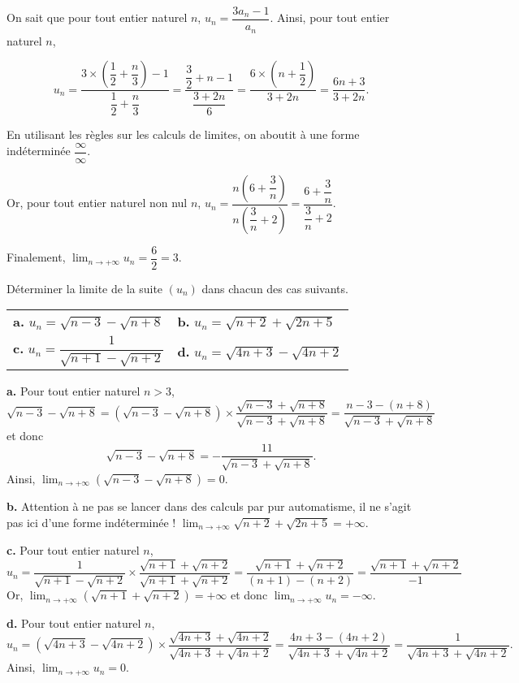 \documentclass[11pt,fleqn]{book} %
\begin{document}
\begin{solution}
On sait que pour tout entier naturel $n$, $u_n=\dfrac{3a_n-1}{a_n}$. Ainsi, pour tout entier naturel $n$,

\[u_n =\dfrac{3 \times \left(\dfrac{1}{2}+\dfrac{n}{3}\right)-1}{\dfrac{1}{2}+\dfrac{n}{3}} =\dfrac{\dfrac{3}{2}+n-1}{\dfrac{3+2n}{6}}=\dfrac{6\times\left(n+\dfrac{1}{2}\right)}{3+2n}=\dfrac{6n+3}{3+2n}.\]

En utilisant les règles sur les calculs de limites, on aboutit à une forme indéterminée $\dfrac{\infty}{\infty}  $. 

Or, pour tout entier naturel non nul $n$, $u_n=\dfrac{n\left(6+\dfrac{3}{n}\right)}{n\left(\dfrac{3}{n}+2\right)}=\dfrac{6+\dfrac{3}{n}}{\dfrac{3}{n}+2}$.

Finalement, $\displaystyle \lim_{n\to+\infty}u_n=\dfrac{6}{2}=3$.\end{solution}



\begin{exercise}[topic=lim03] Déterminer la limite de la suite $(u_n)$ dans chacun des cas suivants.
\begin{center}
\begin{tabularx}{\linewidth}{XX}
\textbf{a.} $ u_n = \sqrt{n-3}-\sqrt{n+8}$ & \textbf{b.} $ u_n=\sqrt{n+2}+\sqrt{2n+5}$ \\
\textbf{c.} $u_n=\dfrac{1}{\sqrt{n+1}-\sqrt{n+2}}$ & \textbf{d.} $u_n=\sqrt{4n+3}-\sqrt{4n+2}$
\end{tabularx}
\end{center}\end{exercise}
\begin{solution}\textbf{a.} Pour tout entier naturel $n>3$, \[\sqrt{n-3}-\sqrt{n+8}=(\sqrt{n-3}-\sqrt{n+8}) \times \dfrac{\sqrt{n-3}+\sqrt{n+8}}{\sqrt{n-3}+\sqrt{n+8}}=\dfrac{n-3-(n+8)}{\sqrt{n-3}+\sqrt{n+8}}\]
et donc
\[\sqrt{n-3}-\sqrt{n+8}=-\dfrac{11}{\sqrt{n-3}+\sqrt{n+8}}.\]
 Ainsi,  $\displaystyle \lim_{n \to +\infty} (\sqrt{n-3}-\sqrt{n+8}) = 0$.\
 
 \textbf{b.} Attention à ne pas se lancer dans des calculs par pur automatisme, il ne s'agit pas ici d'une forme indéterminée ! $\displaystyle \lim_{n \to +\infty} \sqrt{n+2}+\sqrt{2n+5} = +\infty$.
 
 \textbf{c.} Pour tout entier naturel $n$,
\[u_n=\dfrac{1}{\sqrt{n+1}-\sqrt{n+2}} \times \dfrac{\sqrt{n+1}+\sqrt{n+2}}{\sqrt{n+1}+\sqrt{n+2}}=\dfrac{\sqrt{n+1}+\sqrt{n+2}}{(n+1)-(n+2)}=\dfrac{\sqrt{n+1}+\sqrt{n+2}}{-1}\]
Or, $\displaystyle \lim_{n\to+\infty}(\sqrt{n+1}+\sqrt{n+2})=+\infty$ et donc $\displaystyle\lim_{n\to+\infty}u_n=-\infty$.\

\textbf{d.} Pour tout entier naturel $n$,
\[u_n = (\sqrt{4n+3}-\sqrt{4n+2}) \times \dfrac{\sqrt{4n+3}+\sqrt{4n+2}}{\sqrt{4n+3}+\sqrt{4n+2}}= \dfrac{4n+3-(4n+2)}{\sqrt{4n+3}+\sqrt{4n+2}}=\dfrac{1}{\sqrt{4n+3}+\sqrt{4n+2}}.\]
Ainsi, $\displaystyle\lim_{n \to+\infty}u_n=0$.\end{solution}
\end{document}
